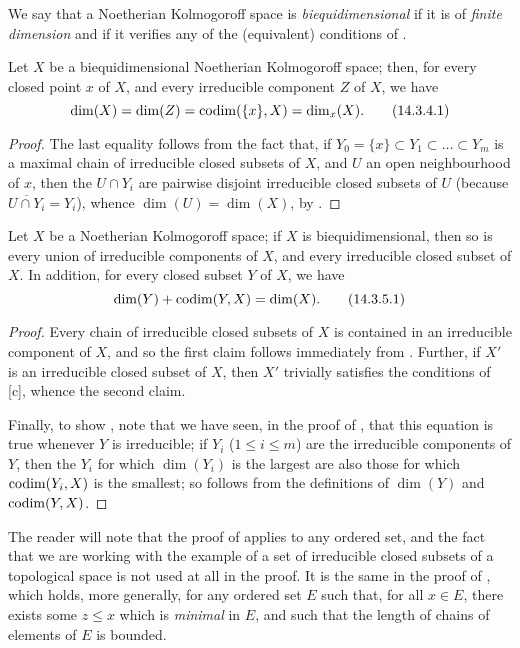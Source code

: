 We say that a Noetherian Kolmogoroff space is \emph{biequidimensional} if it is of \emph{finite dimension} and if it verifies any of the (equivalent) conditions of .

\begin{corollary}[14.3.4]
\label{0.14.3.4}
Let $X$ be a biequidimensional Noetherian Kolmogoroff space;
then, for every closed point $x$ of $X$, and every irreducible component $Z$ of $X$, we have
\[
\label{eq:0.14.3.4.1}
  \dim(X)=\dim(Z)=\operatorname{codim}(\{x\},X)=\dim_x(X).
  \tag{14.3.4.1}
\]
\end{corollary}

\begin{proof}
\label{proof-0.14.3.4}
The last equality follows from the fact that, if $Y_0=\{x\}\subset Y_1\subset\ldots\subset Y_m$ is a maximal chain of irreducible closed subsets of $X$, and $U$ an open neighbourhood of $x$, then the $U\cap Y_i$ are pairwise disjoint irreducible closed subsets of $U$ (because $\overline{U\cap Y_i}=Y_i$), whence $\dim(U)=\dim(X)$, by .
\end{proof}

\begin{corollary}[14.3.5]
\label{0.14.3.5}
Let $X$ be a Noetherian Kolmogoroff space; if $X$ is biequidimensional, then so is every union of irreducible components of $X$, and every irreducible closed subset of $X$.
In addition, for every closed subset $Y$ of $X$, we have
\[
\label{eq:0.14.3.5.1}
  \dim(Y)+\operatorname{codim}(Y,X)=\dim(X).
  \tag{14.3.5.1}
\]
\end{corollary}

\begin{proof}
\label{proof-0.14.3.5}
Every chain of irreducible closed subsets of $X$ is contained in an irreducible component of $X$, and so the first claim follows immediately from .
Further, if $X'$ is an irreducible closed subset of $X$, then $X'$ trivially satisfies the conditions of [c], whence the second claim.

Finally, to show , note that we have seen, in the proof of , that this equation is true whenever $Y$ is irreducible;
if $Y_i$ ($1\leq i\leq m$) are the irreducible components of $Y$, then the $Y_i$ for which $\dim(Y_i)$ is the largest are also those for which $\operatorname{codim}(Y_i,X)$ is the smallest;
so  follows from the definitions of $\dim(Y)$ and $\operatorname{codim}(Y,X)$.
\end{proof}

\begin{remark}[14.3.6]
\label{0.14.3.6}
The reader will note that the proof of  applies to any ordered set, and the fact that we are working with the example of a set of irreducible closed subsets of a topological space is not used at all in the proof.
It is the same in the proof of , which holds, more generally, for any ordered set $E$ such that, for all $x\in E$, there exists some $z\leq x$ which is \emph{minimal} in $E$, and such that the length of chains of elements of $E$ is bounded.
\end{remark}

